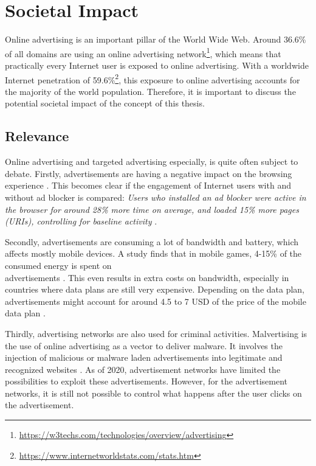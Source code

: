 \chapter{Societal Impact}
\label{cha:societalimpact}

Online advertising is an important pillar of the World Wide Web. Around 36.6\% of all domains are using an online advertising network\footnote{\url{https://w3techs.com/technologies/overview/advertising}}, which means that practically every Internet user is exposed to online advertising. With a worldwide Internet penetration of 59.6\%\footnote{\url{https://www.internetworldstats.com/stats.htm}}, this exposure to online advertising accounts for the majority of the world population. Therefore, it is important to discuss the potential societal impact of the concept of this thesis.

\section{Relevance}
Online advertising and targeted advertising especially, is quite often subject to debate. Firstly, advertisements are having a negative impact on the browsing experience \cite{miroglio2018effect, frik2019impact}. This becomes clear if the engagement of Internet users with and without ad blocker is compared: \textit{Users who installed an ad blocker were active in the browser for around 28\% more time on average, and loaded 15\% more pages (URIs), controlling for baseline activity} \cite{googlefee}.

Secondly, advertisements are consuming a lot of bandwidth and battery, which affects mostly mobile devices. A study finds that in mobile games, 4-15\% of the consumed energy is spent on\\ advertisements \cite{prochkova2012energy}. This even results in extra costs on bandwidth, especially in countries where data plans are still very expensive. Depending on the data plan, advertisements might account for around 4.5 to 7 USD of the price of the mobile data plan \cite{van2012costs}.

Thirdly, advertising networks are also used for criminal activities. Malvertising is the use of online advertising as a vector to deliver malware. It involves the injection of malicious or malware laden advertisements into legitimate and recognized websites \cite{dwyer2016gone}. As of 2020, advertisement networks have limited the possibilities to exploit these advertisements. However, for the advertisement networks, it is still not possible to control what happens after the user clicks on the advertisement.

